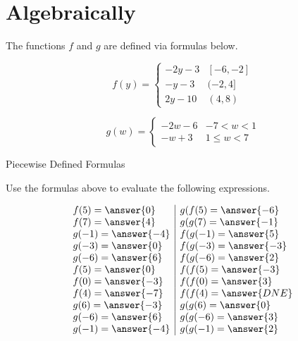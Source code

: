 \documentclass{ximera}
\begin{document}
\section{Algebraically}


The functions $f$ and $g$ are defined via formulas below.






\[
f(y) = 
\begin{cases}
  -2y-3 &  [-6, -2]   \\
  -y-3 &  (-2, 4]  \\
  2y - 10 & (4,8)
\end{cases}
\]












\[
g(w) = 
\begin{cases}
  -2w-6 &   -7 < w < 1 \\
  -w+3 &  1 \leq w < 7
\end{cases}
\]












\begin{question} Piecewise Defined Formulas

Use the formulas above to evaluate the following expressions.



\[
\begin{array}{l|l}
f(5) = \answer{0}  & g(f(5) = \answer{-6}   \\
f(7) = \answer{4}  & g(g(7) = \answer{-1}   \\
g(-1) = \answer{-4}  & f(g(-1) = \answer{5}   \\
g(-3) = \answer{0}  & f(g(-3) = \answer{-3}   \\
g(-6) = \answer{6}  & f(g(-6) = \answer{2}   \\
f(5) = \answer{0}  & f(f(5) = \answer{-3}   \\
f(0) = \answer{-3}  & f(f(0) = \answer{3}   \\
f(4) = \answer{-7}  & f(f(4) = \answer{DNE}   \\
g(6) = \answer{-3}  & g(g(6) = \answer{0}   \\
g(-6) = \answer{6}  & g(g(-6) = \answer{3}   \\
g(-1) = \answer{-4}  & g(g(-1) = \answer{2}   \\
\end{array}
\]



\end{question}
\end{document}
